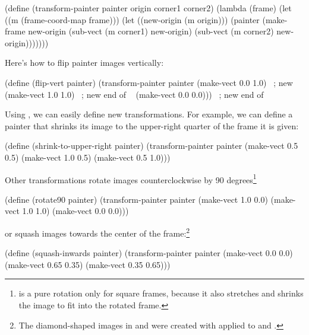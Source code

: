 \begin{codeBlock}
(define (transform-painter painter
                           origin
                           corner1
                           corner2)
  (lambda (frame)
    (let ((m (frame-coord-map frame)))
      (let ((new-origin (m origin)))
        (painter (make-frame
                  new-origin
                  (sub-vect (m corner1)
                            new-origin)
                  (sub-vect (m corner2)
                            new-origin)))))))
\end{codeBlock}

\noindent
Here's how to flip painter images vertically:

\begin{codeBlock}
(define (flip-vert painter)
  (transform-painter
    painter
    (make-vect 0.0 1.0)   ~\textrm{; new }~
    (make-vect 1.0 1.0)   ~\textrm{; new end of }~
    (make-vect 0.0 0.0))) ~\textrm{; new end of }~
\end{codeBlock}

\noindent
Using , we can easily define new transformations.
For example, we can define a painter that shrinks its image to the
upper-right quarter of the frame it is given:

\begin{codeBlock}
(define (shrink-to-upper-right painter)
  (transform-painter
   painter (make-vect 0.5 0.5)
   (make-vect 1.0 0.5) (make-vect 0.5 1.0)))
\end{codeBlock}

\noindent
Other transformations rotate images counterclockwise by 90
degrees\footnote{ is a pure rotation only for square frames,
because it also stretches and shrinks the image to fit into the rotated frame.}

\begin{codeBlock}
(define (rotate90 painter)
  (transform-painter painter
                     (make-vect 1.0 0.0)
                     (make-vect 1.0 1.0)
                     (make-vect 0.0 0.0)))
\end{codeBlock}

\noindent
or squash images towards the center of the frame:\footnote{The diamond-shaped
images in  and  were created with
 applied to  and .}

\begin{codeBlock}
(define (squash-inwards painter)
  (transform-painter painter
                     (make-vect 0.0 0.0)
                     (make-vect 0.65 0.35)
                     (make-vect 0.35 0.65)))
\end{codeBlock}

